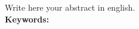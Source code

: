 \begin{thesisabastract}

Write here your abstract in english.\\

\textbf{Keywords:} \ppgmkeywords

\end{thesisabastract}
